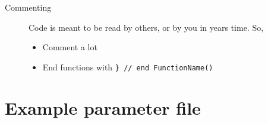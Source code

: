 \documentclass[]{report}
\begin{document}
\begin{description}
\item[Commenting] Code is meant to be read by others, or by you in years time. So,

\begin{itemize}
\item Comment a lot

\item End functions with \verb|} // end FunctionName()|
\end{itemize}

%
%

\end{description}


\appendix

\chapter{Example parameter file}\label{chp:ExampleParam}
\end{document}
